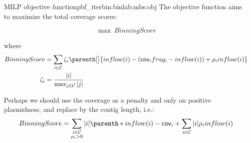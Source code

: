 \begin{definition}{\MBS{} MILP objective function}{pbf_iterbin:binlab:mbs:obj}
  The objective function aims to maximize the total coverage scores:
  \begin{Objective}
    \begin{equation}
      \max ~ BinningScore
      \label{pbf_iterbin:binlab:mbs:obj:max_coverage_score} %
    \end{equation}
  \end{Objective}
  where
  \begin{align*}
    BinningScore & = \sum_{i \in \Contigs{}} \fzeta{i} \parenth[\big]{ inflow(i) - (\cov{i}\frag{i} - inflow(i)) + \plm{i} inflow(i)} \\
    \fzeta{i} & = \frac{ |i| }{ \max_{j \in \Contigs{}} |j| }
  \end{align*}

  \begin{ideabox}
    Perhaps we should use the coverage as a penalty and only on positive plasmidness, and replace \fzeta{} by the contig length, i.e.:
    \[
      BinningScore =  \sum_{
        \substack{
          i \in \Contigs{} \\
          \plm{i} > 0
        }
      } |i| \parenth*{ inflow(i) - \cov{i} }
      + \sum_{i \in \Contigs{}} |i| \plm{i} inflow(i)
    \]
  \end{ideabox}
\end{definition}